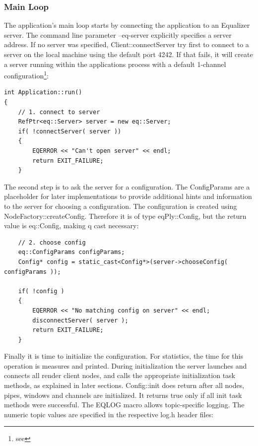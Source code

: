 \documentclass[10pt,a4]{scrartcl}
\begin{document}
\subsubsection{Main Loop}

The application's main loop starts by connecting the application to an
Equalizer server. The command line parameter \textsf{--eq-server}
explicitly specifies a server address. If no server was specified,
\textsf{Client::connectServer} try first to connect to a server on the
local machine using the default port 4242. If that fails, it will create
a server running within the applications process with a default
1-channel configuration\footnote{see
  }:

{\footnotesize\begin{lstlisting}
int Application::run()
{
    // 1. connect to server
    RefPtr<eq::Server> server = new eq::Server;
    if( !connectServer( server ))
    {
        EQERROR << "Can't open server" << endl;
        return EXIT_FAILURE;
    }
\end{lstlisting}}%

The second step is to ask the server for a configuration. The
\textsf{ConfigParams} are a placeholder for later implementations to
provide additional hints and information to the server for choosing a
configuration. The configuration is created using
\textsf{NodeFactory::createConfig}. Therefore it is of type
\textsf{eqPly::Config}, but the return value is \textsf{eq::Config},
making q cast necessary:

{\footnotesize\begin{lstlisting}
    // 2. choose config
    eq::ConfigParams configParams;
    Config* config = static_cast<Config*>(server->chooseConfig( configParams ));

    if( !config )
    {
        EQERROR << "No matching config on server" << endl;
        disconnectServer( server );
        return EXIT_FAILURE;
    }
\end{lstlisting}}%

Finally it is time to initialize the configuration. For statistics, the
time for this operation is measures and printed. During initialization
the server launches and connects all render client nodes, and calls the
appropriate initialization task methods, as explained in later
sections. \textsf{Config::init} does return after all nodes, pipes,
windows and channels are initialized. It returns \textsf{true} only if
all init task methods were successful. The \textsf{EQLOG} macro allows
topic-specific logging. The numeric topic values are specified in the
respective \textsf{log.h} header files:
\end{document}
